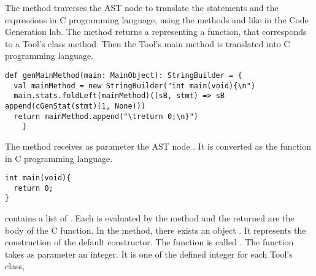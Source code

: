 The method \lstset{style=customc}{\lstinline[basicstyle=\small\ttfamily]|cGenMethod|} traverses the AST node
\lstset{style=customc}{\lstinline[basicstyle=\small\ttfamily]|MethodDecl|} to translate the statements and the expressions
in C programming language, using the methods \lstset{style=customc}{\lstinline[basicstyle=\small\ttfamily]|cGenStats|} and
\lstset{style=customc}{\lstinline[basicstyle=\small\ttfamily]|cGenExpr|} like in the Code Generation lab.
The method returns a \lstset{style=customc}{\lstinline[basicstyle=\small\ttfamily]|StringBuilder|}
representing a function, that corresponds to a Tool's class method.
\newline
Then the Tool's main method is translated into C programming language.
\begin{lstlisting}
def genMainMethod(main: MainObject): StringBuilder = {
  val mainMethod = new StringBuilder("int main(void){\n")
  main.stats.foldLeft(mainMethod)((sB, stmt) => sB append(cGenStat(stmt)(1, None)))
  return mainMethod.append("\treturn 0;\n}")
    }
\end{lstlisting}
The \lstset{style=customc}{\lstinline[basicstyle=\small\ttfamily]|genMainMethod|} method receives
as parameter the AST node \lstset{style=customc}{\lstinline[basicstyle=\small\ttfamily]|MainObject|}.
It is converted as the \lstset{style=customc}{\lstinline[basicstyle=\small\ttfamily]|main|} function in C programming language.
\begin{lstlisting}
int main(void){
  return 0;
}
\end{lstlisting}
\lstset{style=customc}{\lstinline[basicstyle=\small\ttfamily]|MainObject|} contains
a list of \lstset{style=customc}{\lstinline[basicstyle=\small\ttfamily]|StatTree|}.
Each \lstset{style=customc}{\lstinline[basicstyle=\small\ttfamily]|StatTree|} is evaluated
by the method \lstset{style=customc}{\lstinline[basicstyle=\small\ttfamily]|cGenStat|} and
the returned \lstset{style=customc}{\lstinline[basicstyle=\small\ttfamily]|StringBuilder(s)|}
are the body of the C \lstset{style=customc}{\lstinline[basicstyle=\small\ttfamily]|main|} function.
\newline
In the \lstset{style=customc}{\lstinline[basicstyle=\small\ttfamily]|run|} method, there exists
an object
\newline
\lstset{style=customc}{\lstinline[basicstyle=\small\ttfamily]|defaultConstructor|}.
It represents the construction of the default constructor. The function is called
\lstset{style=customc}{\lstinline[basicstyle=\small\ttfamily]|new|}.
The function takes as parameter an integer. It is one of the defined integer for each Tool's class,
